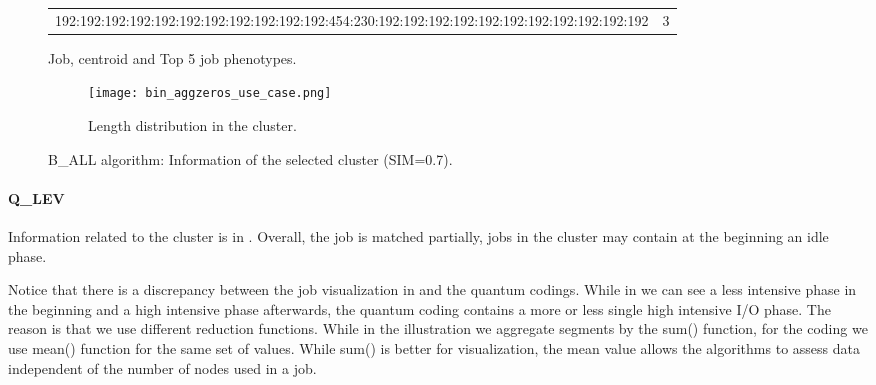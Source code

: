 \documentclass{jhps}
\begin{document}
\begin{figure}
\begin{subtable}{\textwidth}
\begin{tiny}
\begin{tabular}{l|r}
       192:192:192:192:192:192:192:192:192:192:192:454:230:192:192:192:192:192:192:192:192:192:192:192             & 3        \\ 
      \end{tabular}
		\end{tiny}
		\caption{Job, centroid and Top 5 job phenotypes.}
		\label{cluster:use_case:bin_aggzeros:top_jobs}
	\end{subtable}
	\medskip
	\begin{subfigure}{\textwidth}
		\centering
		\texttt{[image: bin\_aggzeros\_use\_case.png]}
		\caption{Length distribution in the cluster.}
		\label{cluster:use_case:bin_aggzeros:length}
	\end{subfigure}
	\caption{B\_ALL algorithm: Information of the selected cluster (SIM=0.7).}
	\label{cluster:use_case:bin_aggzeros}
\end{figure}


\FloatBarrier
\paragraph{Q\_LEV}
Information related to the cluster is in .
Overall, the job is matched partially, jobs in the cluster may contain at the beginning an idle phase.

Notice that there is a discrepancy between the job visualization in  and the quantum codings.
While in  we can see a less intensive phase in the beginning and a high intensive phase afterwards, the quantum coding contains a more or less single high intensive I/O phase.
The reason is that we use different reduction functions.
While in the illustration we aggregate segments by the sum() function, for the coding we use mean() function for the same set of values.
While sum() is better for visualization, the mean value allows the algorithms to assess data independent of the number of nodes used in a job.
\end{document}
